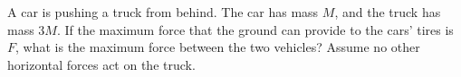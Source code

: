 A car is pushing a truck from behind. The car has mass $M$, and the
truck has mass $3M$. If the maximum force that the ground can provide
to the cars' tires is $F$, what is the maximum force between
the two vehicles? Assume no other horizontal forces act on the truck.
